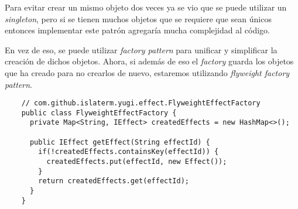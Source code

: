 \begin{Answer}[ref={ex:flyweight-1}]
  Para evitar crear un mismo objeto dos veces ya se vio que se puede utilizar un 
  \textit{singleton}, pero si se tienen muchos objetos que se requiere que sean únicos
  entonces implementar este patrón agregaría mucha complejidad al código.
  
  En vez de eso, se puede utilizar \textit{factory pattern} para unificar y simplificar la
  creación de dichos objetos.
  Ahora, si además de eso el \textit{factory} guarda los objetos que ha creado para no 
  crearlos de nuevo, estaremos utilizando \textit{flyweight factory pattern}.

  \begin{verbatim}
    // com.github.islaterm.yugi.effect.FlyweightEffectFactory
    public class FlyweightEffectFactory {
      private Map<String, IEffect> createdEffects = new HashMap<>();

      public IEffect getEffect(String effectId) {
        if(!createdEffects.containsKey(effectId)) {
          createdEffects.put(effectId, new Effect());
        }
        return createdEffects.get(effectId);
      }
    }
  \end{verbatim}
\end{Answer}
